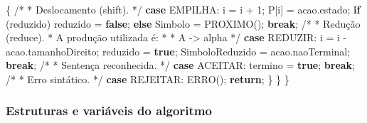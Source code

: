 \documentclass[
  brazilian,
  letterpaper,
]{book}
\newenvironment{Shaded}{\begin{snugshade}}{\end{snugshade}}
\newcommand{\CommentTok}[1]{\textcolor[rgb]{0.37,0.37,0.37}{#1}}
\newcommand{\ControlFlowTok}[1]{\textcolor[rgb]{0.00,0.23,0.31}{\textbf{#1}}}
\newcommand{\DecValTok}[1]{\textcolor[rgb]{0.68,0.00,0.00}{#1}}
\newcommand{\KeywordTok}[1]{\textcolor[rgb]{0.00,0.23,0.31}{\textbf{#1}}}
\newcommand{\NormalTok}[1]{\textcolor[rgb]{0.00,0.23,0.31}{#1}}
\newcommand{\OperatorTok}[1]{\textcolor[rgb]{0.37,0.37,0.37}{#1}}
\theoremstyle{plain}
\theoremstyle{definition}
\theoremstyle{remark}
\begin{document}
\begin{Shaded}
\begin{Highlighting}[]
        \OperatorTok{\{}
            \CommentTok{/*}
\CommentTok{             * Deslocamento (shift).}
\CommentTok{             */}
            \ControlFlowTok{case}\NormalTok{ EMPILHA}\OperatorTok{:}
\NormalTok{                i }\OperatorTok{=}\NormalTok{ i }\OperatorTok{+} \DecValTok{1}\OperatorTok{;}
\NormalTok{                P}\OperatorTok{[}\NormalTok{i}\OperatorTok{]} \OperatorTok{=}\NormalTok{ acao}\OperatorTok{.}\NormalTok{estado}\OperatorTok{;}
                \ControlFlowTok{if} \OperatorTok{(}\NormalTok{reduzido}\OperatorTok{)}
\NormalTok{                    reduzido }\OperatorTok{=} \KeywordTok{false}\OperatorTok{;}
                \ControlFlowTok{else}
\NormalTok{                    Simbolo }\OperatorTok{=}\NormalTok{ PROXIMO}\OperatorTok{();}
                \ControlFlowTok{break}\OperatorTok{;}
            \CommentTok{/*}
\CommentTok{             * Redução (reduce).}
\CommentTok{             * A produção utilizada é:}
\CommentTok{             *}
\CommentTok{             *     A {-}\textgreater{} alpha}
\CommentTok{             */}
            \ControlFlowTok{case}\NormalTok{ REDUZIR}\OperatorTok{:}
\NormalTok{                i }\OperatorTok{=}\NormalTok{ i }\OperatorTok{{-}}\NormalTok{ acao}\OperatorTok{.}\NormalTok{tamanhoDireito}\OperatorTok{;}
\NormalTok{                reduzido }\OperatorTok{=} \KeywordTok{true}\OperatorTok{;}
\NormalTok{                SimboloReduzido }\OperatorTok{=}\NormalTok{ acao}\OperatorTok{.}\NormalTok{naoTerminal}\OperatorTok{;}
                \ControlFlowTok{break}\OperatorTok{;}
            \CommentTok{/*}
\CommentTok{             * Sentença reconhecida.}
\CommentTok{             */}
            \ControlFlowTok{case}\NormalTok{ ACEITAR}\OperatorTok{:}
\NormalTok{                termino }\OperatorTok{=} \KeywordTok{true}\OperatorTok{;}
                \ControlFlowTok{break}\OperatorTok{;}
            \CommentTok{/*}
\CommentTok{             * Erro sintático.}
\CommentTok{             */}
            \ControlFlowTok{case}\NormalTok{ REJEITAR}\OperatorTok{:}
\NormalTok{                ERRO}\OperatorTok{();}
                \ControlFlowTok{return}\OperatorTok{;}
        \OperatorTok{\}}
    \OperatorTok{\}}
\OperatorTok{\}}
\end{Highlighting}
\end{Shaded}

\subsubsection{Estruturas e variáveis do
algoritmo}\label{estruturas-e-variuxe1veis-do-algoritmo}
\end{document}
